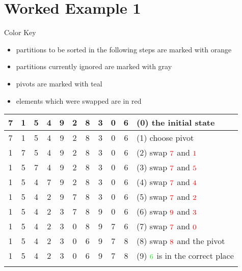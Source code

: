 \section{Worked Example 1}
Color Key
\begin{itemize}
    \item partitions to be sorted in the following steps are marked with {\color{Amber}orange}
    \item partitions currently ignored are marked with {\color{gray}gray}
    \item pivots are marked with {\color{cyan}teal}
    \item elements which were swapped are in {\color{red}red}
\end{itemize}

\begin{center}
    \begin{longtable}{ | c | c | c | c | c | c | c | c | c | c || l | }
        \hline
        7 & 1 & 5 & 4 & 9 & 2 & 8 & 3 & 0 & 6 &(0) the initial state \\ \hline
        7 & 1 & 5 & 4 & 9 & 2 & 8 & 3 & 0 &\cellcolor{LightCyan}6 &(1) choose \color{cyan}pivot\\ \hline %
        \color{red}1 & \color{red}7 & 5 & 4 & 9 & 2 & 8 & 3 & 0 &\cellcolor{LightCyan}6 &(2) swap \(\color{red}7\) and \(\color{red}1\)\\ \hline %
        1 & \color{red}5 & \color{red}7 & 4 & 9 & 2 & 8 & 3 & 0 &\cellcolor{LightCyan}6 &(3) swap \(\color{red}7\) and \(\color{red}5\)\\ \hline %
        1 & 5 & \color{red}4 & \color{red}7 & 9 & 2 & 8 & 3 & 0 &\cellcolor{LightCyan}6 &(4) swap \(\color{red}7\) and \(\color{red}4\)\\ \hline %
        1 & 5 & 4 & \color{red}2 & 9 & \color{red} 7 & 8 & 3 & 0 &\cellcolor{LightCyan}6 &(5) swap \(\color{red}7\) and \(\color{red}2\)\\ \hline %
        1 & 5 & 4 & 2 & \color{red}3 & 7 & 8 & \color{red}9 & 0 &\cellcolor{LightCyan}6 &(6) swap \(\color{red}9\) and \(\color{red}3\)\\ \hline %
        1 & 5 & 4 & 2 & 3 & \color{red}0 & 8 & 9 & \color{red}7 &\cellcolor{LightCyan}6 &(7) swap \(\color{red}7\) and \(\color{red}0\)\\ \hline %
        1 & 5 & 4 & 2 & 3 & 0 & \color{cyan}6 & 9 & 7 & \color{red}8 &(8) swap \(\color{red}8\) and the {\color{cyan}pivot}\\ \hline %
        1 & 5 & 4 & 2 & 3 & 0 & \cellcolor{LightGreen}6 & 9 & 7 & 8 &(9) \(\color{green}6\) is in the correct place \\ \hhline{===========}

\end{longtable}
\end{center}
